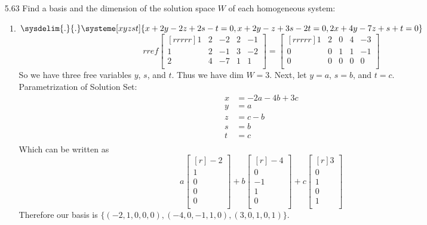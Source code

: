 \documentclass[12pt]{article}
\begin{document}
\begin{enumerate}
\begin{enumerate}
	\end{enumerate}
\item[5.63] Find a basis and the dimension of the solution space $W$ of each homogeneous system:
	\begin{enumerate}
	\item $\sysdelim{.}{.}\systeme[xyzst]{x+2y-2z+2s-t=0,x+2y-z+3s-2t=0,2x+4y-7z+s+t=0}$
		\[ rref\begin{bmatrix}[rrrrr]1&2&-2&2&-1\\1&2&-1&3&-2\\2&4&-7&1&1\\\end{bmatrix}=\begin{bmatrix}[rrrrr]1&2&0&4&-3\\0&0&1&1&-1\\0&0&0&0&0\\\end{bmatrix} \]
		So we have three free variables $y$, $s$, and $t$. Thus we have dim $W=3$. Next, let $y=a$, $s=b$, and $t=c$.\\
		Parametrization of Solution Set:
		\begin{align*}
		x&=-2a-4b+3c\\
		y&=a\\
		z&=c-b\\
		s&=b\\
		t&=c\\
		\end{align*}
		Which can be written as
		\[ a\begin{bmatrix}[r]-2\\1\\0\\0\\0\\\end{bmatrix} +b\begin{bmatrix}[r]-4\\0\\-1\\1\\0\\\end{bmatrix}+c\begin{bmatrix}[r]3\\0\\1\\0\\1\\\end{bmatrix} \]
		Therefore our basis is $\{(-2,1,0,0,0),(-4,0,-1,1,0),(3,0,1,0,1)\}$.
	\end{enumerate}
	

\end{enumerate}
\end{document}
